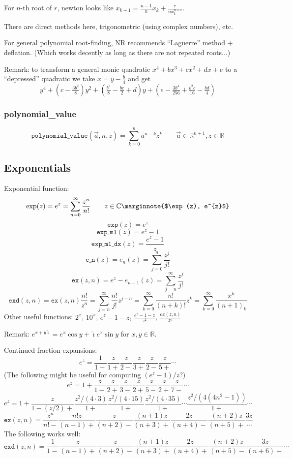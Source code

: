 \documentclass[10pt,dvipdfmx,letterpaper,twoside]{article}
\newcommand{\F}[1]{{\mathtt{#1}}}
\newcommand{\RR}{{\mathbb{R}}}
\newcommand{\CC}{{\mathbb{C}}}
\newcommand{\ii}{{\hat{\imath}}}
\let\DEF=\marginnote
\begin{document}
For $n$-th root of $r$, newton looks like $x_{k+1} = \frac{n-1}{n}x_k + \frac{r}{n x_k^{n-1}}$.

There are direct methods here, trigonometric (using complex numbers), etc.

For general polynomial root-finding, NR recommends ``Laguerre'' method + deflation.  (Which works decently as long as there are not repeated roots...)

Remark: to transform a general monic quadratic $x^4 + bx^3 + cx^2 + dx + e$ to a ``depressed'' quadratic we take $x=y - \tfrac{b}{4}$ and get
\[ y^4 + (c-\tfrac{3b^2}{8})y^2 + (\tfrac{b^3}{8} - \tfrac{bc}{2} + d)y + (e - \tfrac{3b^4}{256} + \tfrac{b^2c}{16} - \tfrac{bd}{4}) \]


\subsubsection{polynomial\_value}
\[ \F{polynomial\_value}(\vec{a},n,z) = \sum_{k=0}^{n}a^{n-k}z^k \qquad \vec{a}\in\RR^{n+1}, z\in\RR \]

\subsection{Exponentials}
Exponential function:
\[ \exp(z) = e^{z} = \sum_{n=0}^\infty\frac{z^n}{n!} \qquad z\in\CC   \DEF{$\exp(z), e^{z}$}\]
\[ \F{exp}(z) = e^z \]
\[ \F{exp\_m1}(z) = e^z-1 \]
\[ \F{exp\_m1\_dx}(z) = \frac{e^z-1}{z} \]
\[ \F{e\_n}(z) = e_{n}(z) = \sum_{j=0}^n\frac{z^j}{j!} \]
\[ \F{ex}(z,n) = e^z - e_{n-1}(z) = \sum_{j=n}^\infty \frac{z^j}{j!} \]
\[ \F{exd}(z,n) = \F{ex}(z,n)\frac{n!}{z^n} = \sum_{j=n}^\infty\frac{n!}{j!}z^{j-n} = \sum_{k=0}^\infty\frac{n!}{(n+k)!}z^k = \sum_{k=0}^\infty\frac{x^k}{(n+1)_k} \]
Other useful functions: $2^x$, $10^x$, $e^z-1-z$, $\frac{e^z-1-z}{z^2}$, $\frac{ex(z,n)}{z^{n}}$

Remark: $e^{x+y\ii} = e^x\cos y + \ii e^x\sin y$ for $x,y\in\RR$.

Continued fraction expansions:
\[ e^z = \frac{1}{1-{}} \frac{z}{1+{}} \frac{z}{2-{}} \frac{z}{3+{}} \frac{z}{2-{}} \frac{z}{5+{}} \cdots\]
(The following might be useful for computing $(e^z-1)/z$?)
\[ e^z = 1+\frac{z}{1-} \frac{z}{2+} \frac{z}{3-} \frac{z}{2+} \frac{z}{5-} \frac{z}{2+} \frac{z}{7-} \cdots \]
\[ e^z = 1+\frac{z}{1-(z/2)+} \frac{z^2/(4\cdot3)}{1+} \frac{z^2/(4\cdot15)}{1+} \frac{z^2/(4\cdot35)}{1+} \cdots \frac{z^2/(4(4n^2-1))}{1+} \cdots \]
\[ \F{ex}(z,n) = \frac{z^n}{n!-{}} \frac{n! z}{(n+1)+{}} \frac{z}{(n+2)-{}} \frac{(n+1)z}{(n+3)+{}} \frac{2z}{(n+4)-{}} \frac{(n+2)z}{(n+5)+{}} \frac{3z}{\cdots} \]
The following works well:
\[ \F{exd}(z,n) = \frac{1}{1-} \frac{z}{(n+1)+} \frac{z}{(n+2)-} \frac{(n+1)z}{(n+3)+} \frac{2z}{(n+4)+} \frac{(n+2)z}{(n+5)-} \frac{3z}{(n+6)+} \cdots\]
\end{document}
